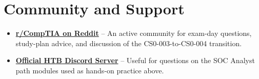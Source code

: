 \documentclass[11pt,letterpaper]{article}
\begin{document}
\section{Community and Support}
\begin{itemize}
\item \textbf{\href{https://www.reddit.com/r/CompTIA/}{r/CompTIA on Reddit}} -- An active community for exam-day questions, study-plan advice, and discussion of the CS0-003-to-CS0-004 transition.
\item \textbf{\href{https://discord.com/invite/hackthebox}{Official HTB Discord Server}} -- Useful for questions on the SOC Analyst path modules used as hands-on practice above.
\end{itemize}
\end{document}
